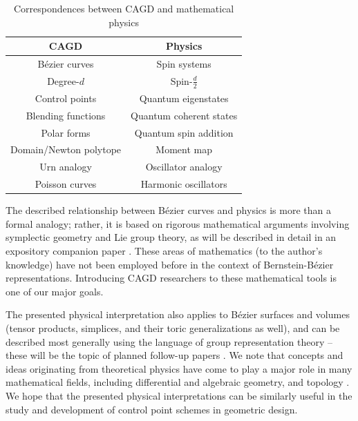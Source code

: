 \documentclass[12pt,final,3p]{elsarticle}
\begin{document}
\begin{table}[h]
	\centering
	\begin{tabular}[c]{|c|c|}
		\hline
		CAGD & Physics \\\hline\hline
		B\'{e}zier curves & Spin systems \\\hline
		Degree-$d$ & Spin-$\frac{d}{2}$ \\\hline
		Control points & Quantum eigenstates \\\hline
		Blending functions & Quantum coherent states \\\hline
		Polar forms & Quantum spin addition \\\hline
		Domain/Newton polytope & Moment map \\\hline
		Urn analogy & Oscillator analogy \\\hline
		Poisson curves & Harmonic oscillators \\ 
		\hline
	\end{tabular}
	\caption{Correspondences between CAGD and mathematical  physics}
	\label{tab:list}
\end{table}

The described relationship between B\'{e}zier curves and physics is more than a formal analogy; rather, it is based on rigorous mathematical arguments involving symplectic geometry and Lie group theory, as will be described in detail in an expository companion paper \cite{vaitkus2018physics}. These areas of mathematics (to the author's knowledge) have not been employed before in the context of Bernstein-B\'{e}zier representations. Introducing CAGD researchers to these mathematical tools is one of our major goals.
 
The presented physical interpretation also applies to B\'{e}zier surfaces and volumes (tensor products, simplices, and their toric generalizations \cite{krasauskas2002toric} as well), and can be described most generally using the language of group representation theory -- these will be the topic of planned follow-up papers \cite{vaitkus2018surface,vaitkus2018repthy}. We note that concepts and ideas originating from theoretical physics have come to play a major role in many mathematical fields, including differential and algebraic geometry, and topology \cite{atiyah2010geometry}. We hope that the presented physical interpretations can be similarly useful in the study and development of control point schemes in geometric design.
\end{document}
